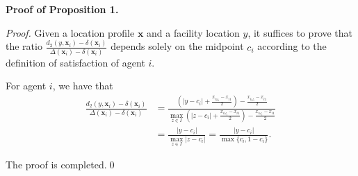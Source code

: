 \documentclass[runningheads]{11llncst}
\begin{document}
\noindent
\textbf{Proof of Proposition 1.}
\begin{proof}
    Given a location profile $\textbf{x}$ and a facility location $y$,  it suffices to  prove that the ratio 
 $ \frac{d_2(y,\textbf{x}_i)-\delta(\textbf{x}_i)}{\Delta(\textbf{x}_i)-\delta(\textbf{x}_i)} $ depends solely on the midpoint $c_i$  according to the definition of satisfaction of agent $i$. 

For agent $i$, we have that 
\begin{equation*}
\begin{aligned}
     \frac{d_2(y,\textbf{x}_i)-\delta(\textbf{x}_i)}{\Delta(\textbf{x}_i)-\delta(\textbf{x}_i)}
     &=\frac{(|y-c_i|+\frac{x_{i\omega_i}-x_{i1}}{2})-\frac{x_{i\omega_i}-x_{i1}}{2}}{\max_{z\in I}(|z-c_i|+\frac{x_{i\omega_i}-x_{i1}}{2})-\frac{x_{i\omega_i}-x_{i1}}{2}}\\
    &=\frac{|y-c_i|}{\max_{z\in I}|z-c_i|}=\frac{|y-c_i|}{\max\{c_i,1-c_i\}}.
\end{aligned}
\end{equation*}


The proof is completed.\qed
\end{proof}
\end{document}

